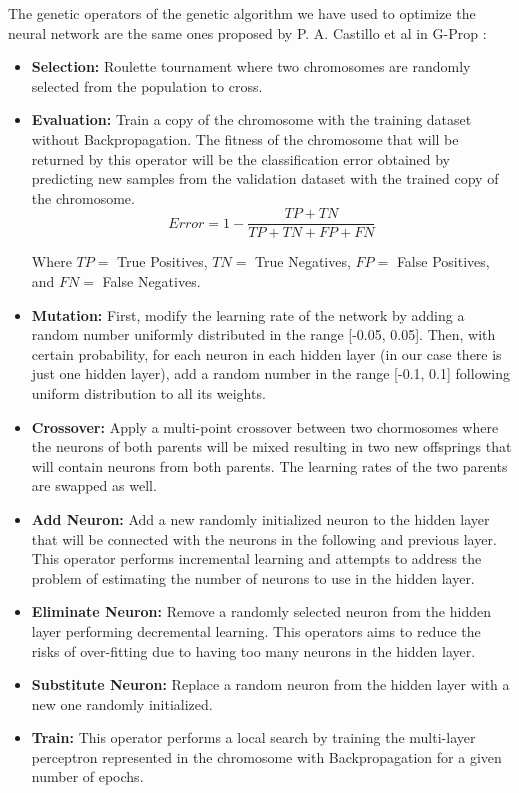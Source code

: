 The genetic operators of the genetic algorithm we have used  to optimize the neural network are the same ones proposed by P. A. Castillo et al in G-Prop \cite{gprop}:

\begin{itemize}
	\item \textbf{Selection:} Roulette tournament where two chromosomes are randomly selected from the population to cross.
	
	\item \textbf{Evaluation:} Train a copy of the chromosome with the training dataset without Backpropagation. The fitness of the chromosome that will be returned by this operator will be the classification error obtained by predicting new samples from the validation dataset with the trained copy of the chromosome.
	$$ Error = 1 - \frac{TP + TN}{TP + TN + FP + FN}  $$
	
	Where $TP = $ True Positives, $TN = $ True Negatives, $FP = $ False Positives, and $FN = $ False Negatives.
	
	\item \textbf{Mutation:} First, modify the learning rate of the network by adding a random number uniformly distributed in the range [-0.05, 0.05]. Then, with certain probability, for each neuron in each hidden layer (in our case there is just one hidden layer), add a random number in the range [-0.1, 0.1] following uniform distribution to all its weights.
	
	\item \textbf{Crossover:} Apply a multi-point crossover between two chormosomes where the neurons of both parents will be mixed resulting in two new offsprings that will contain neurons from both parents. The learning rates of the two parents are swapped as well.
	
	\item \textbf{Add Neuron:} Add a new randomly initialized neuron to the hidden layer that will be connected with the neurons in the following and previous layer. This operator performs incremental learning and attempts to address the problem of estimating the number of neurons to use in the hidden layer.
	
	\item \textbf{Eliminate Neuron:} Remove a randomly selected neuron from the hidden layer performing decremental learning. This operators aims to reduce the risks of over-fitting due to having too many neurons in the hidden layer.
	
	\item \textbf{Substitute Neuron:} Replace a random neuron from the hidden layer with a new one randomly initialized.
	
	\item \textbf{Train:} This operator performs a local search by training the multi-layer perceptron represented in the chromosome with Backpropagation \cite{backpropagation} for a given number of epochs.
\end{itemize}

